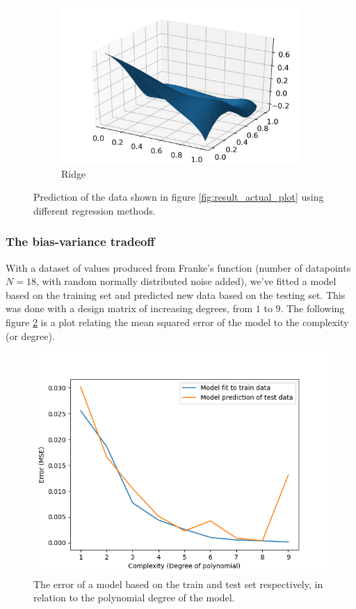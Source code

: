 \documentclass[../main.tex]{subfiles}
\begin{document}
\begin{figure}[h]
    \begin{subfigure}[b]{0.48\textwidth}
        \centering
        \includegraphics[width=\textwidth]{../assets/ridge_franke_plot.png}
        \caption{Ridge}
    \end{subfigure}
    \caption{Prediction of the data shown in figure \ref{fig:result_actual_plot} using different regression methods.}
    \label{fig:result_reg_plots}
\end{figure}

\subsubsection{The bias-variance tradeoff}
With a dataset of values produced from Franke's function (number of datapoints $N=18$, with random normally distributed noise added), we've fitted a model based on the training set and predicted new data based on the testing set. This was done with a design matrix of increasing degrees, from $1$ to $9$. The following figure \ref{fig:result_complexity} is a plot relating the mean squared error of the model to the complexity (or degree).

\begin{figure}[h]
    \centering
    \includegraphics[width=\textwidth]{../assets/complexity.png}
    \caption{The error of a model based on the train and test set respectively, in relation to the polynomial degree of the model.}
    \label{fig:result_complexity}
\end{figure}
\end{document}
